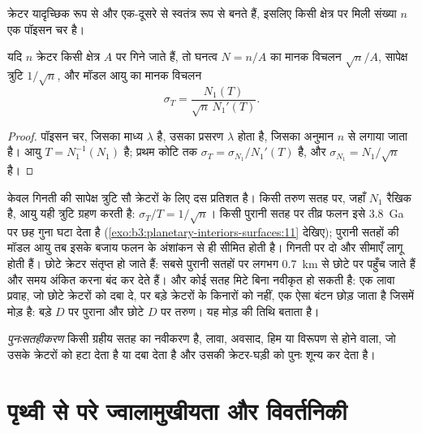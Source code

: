 क्रेटर यादृच्छिक रूप से और एक-दूसरे से स्वतंत्र रूप से बनते हैं, इसलिए
किसी क्षेत्र पर मिली संख्या $n$ एक पॉइसन चर है।

\begin{proposition}[मॉडल आयु की गणना-त्रुटि]\label{prop:b3:planetary-interiors-surfaces:poisson}
यदि $n$ क्रेटर किसी क्षेत्र $A$ पर गिने जाते हैं, तो घनत्व $N = n/A$ का
मानक विचलन $\sqrt n/A$, सापेक्ष त्रुटि $1/\sqrt n$, और मॉडल
आयु का मानक विचलन
\[
  \sigma_T = \frac{N_1(T)}{\sqrt n\,N_1'(T)} .
\]
\end{proposition}

\begin{proof}
पॉइसन चर, जिसका माध्य $\lambda$ है, उसका प्रसरण $\lambda$ होता है, जिसका अनुमान
$n$ से लगाया जाता है। आयु $T = N_1^{-1}(N_1)$ है; प्रथम कोटि तक $\sigma_T =
\sigma_{N_1}/N_1'(T)$ है, और $\sigma_{N_1} = N_1/\sqrt n$ है।
\end{proof}

केवल गिनती की सापेक्ष त्रुटि सौ क्रेटरों के लिए
दस प्रतिशत है। किसी तरुण सतह पर, जहाँ $N_1$ रैखिक है, आयु यही त्रुटि ग्रहण करती है:
$\sigma_T/T = 1/\sqrt n$। किसी पुरानी सतह पर तीव्र फलन इसे
\qty{3.8}{Ga} पर छह गुना घटा देता है (\cref{exo:b3:planetary-interiors-surfaces:11} देखिए);
पुरानी सतहों की मॉडल आयु तब इसके बजाय
फलन के अंशांकन से ही सीमित होती है। गिनती पर दो और सीमाएँ लागू होती हैं। छोटे क्रेटर
संतृप्त हो जाते हैं: सबसे पुरानी सतहों पर लगभग \qty{0.7}{km} से छोटे  पर पहुँच जाते हैं और
समय अंकित करना बंद कर देते हैं। और कोई सतह मिटे बिना नवीकृत हो सकती है:
एक लावा प्रवाह, जो छोटे क्रेटरों को दबा दे, पर बड़े क्रेटरों के किनारों को नहीं,
एक ऐसा बंटन छोड़ जाता है जिसमें मोड़ है: बड़े $D$ पर पुराना और छोटे $D$ पर
तरुण। यह मोड़  की तिथि बताता है।

\begin{definition}\label{def:b3:planetary-interiors-surfaces:resurfacing}
\emph{पुनःसतहीकरण} किसी ग्रहीय सतह का नवीकरण है,
लावा, अवसाद, हिम या विरूपण से होने वाला, जो उसके क्रेटरों को हटा देता है या दबा देता है और
उसकी क्रेटर-घड़ी को पुनः शून्य कर देता है।
\end{definition}

\section{पृथ्वी से परे ज्वालामुखीयता और विवर्तनिकी}\label{sec:b3:planetary-interiors-surfaces:volcanism}

